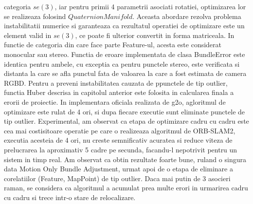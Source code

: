 \documentclass[12pt,a4paper]{report}
\begin{document}
categoria $ se(3) $, iar pentru primii 4 parametrii asociati rotatiei, optimizarea lor se realizeaza
folosind $ QuaternionManifold $. Aceasta abordare rezolva problema instabilitatii numerice si 
garanteaza ca rezultatul operatiei de optimizare este un element valid in $ se(3) $, ce poate fi 
ulterior convertit in forma matriceala. In functie de categoria din care face parte Feature-ul, 
acesta este considerat monocular sau stereo. Functia de eroare implementata de clasa BundleError 
este identica pentru ambele, cu exceptia ca pentru punctele stereo, este verificata si distanta 
la care se afla punctul fata de valoarea la care a fost estimata de camera RGBD. Pentru a preveni
instabilitatea cauzata de ppunctele de tip outlier, functia Huber descrisa in capitolul anterior este
folosita in calcularea finala a erorii de proiectie. In implementara oficiala realizata de g2o, 
agloritmul de optimizare este rulat de 4 ori, si dupa fiecare executie sunt eliminate punctele de tip 
outlier. Experimental, am observat ca etapa de optimizare cadru cu cadru este cea mai costisitoare 
operatie pe care o realizeaza algoritmul de ORB-SLAM2, executia acesteia de 4 ori, nu creste 
semnificativ acuratea si reduce viteza de prelucrarea la aproximativ 5 cadre pe secunda, facandu-l 
nepotrivit pentru un sistem in timp real. Am observat ca obtin rezultate foarte bune, ruland o singura
data Motion Only Bundle Adjustment, urmat apoi de o etapa de eliminare a corelatiilor 
(Feature, MapPoint) de tip outlier. Daca mai putin de 3 asocieri raman, se considera ca algoritmul
a acumulat prea multe erori in urmarirea cadru cu cadru si trece intr-o stare de relocalizare.
\end{document}

